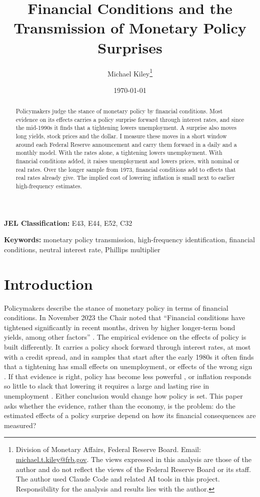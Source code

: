 \documentclass[11pt]{article}
\title{Financial Conditions and the Transmission of Monetary Policy Surprises}
\author{Michael Kiley\thanks{Division of Monetary Affairs, Federal Reserve Board. Email: \href{mailto:michael.t.kiley@frb.gov}{michael.t.kiley@frb.gov}. The views expressed in this analysis are those of the author and do not reflect the views of the Federal Reserve Board or its staff. The author used Claude Code and related AI tools in this project. Responsibility for the analysis and results lies with the author.}}
\date{\today}
\begin{document}
\maketitle

\begin{abstract}
Policymakers judge the stance of monetary policy by financial conditions. Most evidence on its effects carries a policy surprise forward through interest rates, and since the mid-1990s it finds that a tightening lowers unemployment. A surprise also moves long yields, stock prices and the dollar. I measure these moves in a short window around each Federal Reserve announcement and carry them forward in a daily and a monthly model. With the rates alone, a tightening lowers unemployment. With financial conditions added, it raises unemployment and lowers prices, with nominal or real rates. Over the longer sample from 1973, financial conditions add to effects that real rates already give. The implied cost of lowering inflation is small next to earlier high-frequency estimates.
\end{abstract}

\noindent\textbf{JEL Classification:} E43, E44, E52, C32

\noindent\textbf{Keywords:} monetary policy transmission, high-frequency identification, financial conditions, neutral interest rate, Phillips multiplier

\pagestyle{plain}

\newpage
{}

\section{Introduction}
\label{sec:intro}
Policymakers describe the stance of monetary policy in terms of financial conditions. In November 2023 the Chair noted that ``Financial conditions have tightened significantly in recent months, driven by higher longer-term bond yields, among other factors'' \citep{powell2023}. The empirical evidence on the effects of policy is built differently. It carries a policy shock forward through interest rates, at most with a credit spread, and in samples that start after the early 1980s it often finds that a tightening has small effects on unemployment, or effects of the wrong sign \citep{ramey2016}. If that evidence is right, policy has become less powerful \citep{boivin2006,boivin2010}, or inflation responds so little to slack that lowering it requires a large and lasting rise in unemployment \citep{hazell2022,delnegro2020}. Either conclusion would change how policy is set. This paper asks whether the evidence, rather than the economy, is the problem: do the estimated effects of a policy surprise depend on how its financial consequences are measured?
\end{document}
